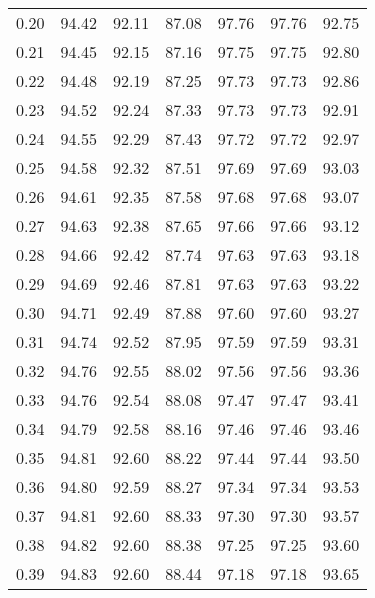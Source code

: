 \begin{tabular}{|c|c|c|c|c|c|c|}
      0.20 &     94.42 &     92.11 &      87.08 &   97.76 &      97.76 &         92.75 \\
      0.21 &     94.45 &     92.15 &      87.16 &   97.75 &      97.75 &         92.80 \\
      0.22 &     94.48 &     92.19 &      87.25 &   97.73 &      97.73 &         92.86 \\
      0.23 &     94.52 &     92.24 &      87.33 &   97.73 &      97.73 &         92.91 \\
      0.24 &     94.55 &     92.29 &      87.43 &   97.72 &      97.72 &         92.97 \\
      0.25 &     94.58 &     92.32 &      87.51 &   97.69 &      97.69 &         93.03 \\
      0.26 &     94.61 &     92.35 &      87.58 &   97.68 &      97.68 &         93.07 \\
      0.27 &     94.63 &     92.38 &      87.65 &   97.66 &      97.66 &         93.12 \\
      0.28 &     94.66 &     92.42 &      87.74 &   97.63 &      97.63 &         93.18 \\
      0.29 &     94.69 &     92.46 &      87.81 &   97.63 &      97.63 &         93.22 \\
      0.30 &     94.71 &     92.49 &      87.88 &   97.60 &      97.60 &         93.27 \\
      0.31 &     94.74 &     92.52 &      87.95 &   97.59 &      97.59 &         93.31 \\
      0.32 &     94.76 &     92.55 &      88.02 &   97.56 &      97.56 &         93.36 \\
      0.33 &     94.76 &     92.54 &      88.08 &   97.47 &      97.47 &         93.41 \\
      0.34 &     94.79 &     92.58 &      88.16 &   97.46 &      97.46 &         93.46 \\
      0.35 &     94.81 &     92.60 &      88.22 &   97.44 &      97.44 &         93.50 \\
      0.36 &     94.80 &     92.59 &      88.27 &   97.34 &      97.34 &         93.53 \\
      0.37 &     94.81 &     92.60 &      88.33 &   97.30 &      97.30 &         93.57 \\
      0.38 &     94.82 &     92.60 &      88.38 &   97.25 &      97.25 &         93.60 \\
      0.39 &     94.83 &     92.60 &      88.44 &   97.18 &      97.18 &         93.65 \\

\end{tabular}
